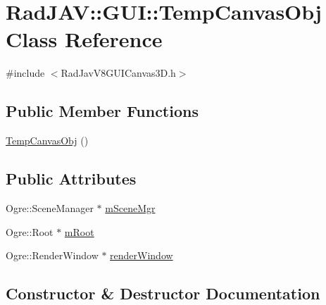 \hypertarget{class_rad_j_a_v_1_1_g_u_i_1_1_temp_canvas_obj}{}\section{Rad\+J\+AV\+:\+:G\+UI\+:\+:Temp\+Canvas\+Obj Class Reference}
\label{class_rad_j_a_v_1_1_g_u_i_1_1_temp_canvas_obj}


{\ttfamily \#include $<$Rad\+Jav\+V8\+G\+U\+I\+Canvas3\+D.\+h$>$}

\subsection*{Public Member Functions}
\begin{DoxyCompactItemize}
\item 
\mbox{\hyperlink{class_rad_j_a_v_1_1_g_u_i_1_1_temp_canvas_obj_ae1a5fb66696f2b94de71652f0613ca5a}{Temp\+Canvas\+Obj}} ()
\end{DoxyCompactItemize}
\subsection*{Public Attributes}
\begin{DoxyCompactItemize}
\item 
Ogre\+::\+Scene\+Manager $\ast$ \mbox{\hyperlink{class_rad_j_a_v_1_1_g_u_i_1_1_temp_canvas_obj_aa2b8387f14ff02b5db4621f9daed10a1}{m\+Scene\+Mgr}}
\item 
Ogre\+::\+Root $\ast$ \mbox{\hyperlink{class_rad_j_a_v_1_1_g_u_i_1_1_temp_canvas_obj_a0031148715e2ea9e16e94119e50fe462}{m\+Root}}
\item 
Ogre\+::\+Render\+Window $\ast$ \mbox{\hyperlink{class_rad_j_a_v_1_1_g_u_i_1_1_temp_canvas_obj_a213b57816b6cc626aa4d6572143201db}{render\+Window}}
\end{DoxyCompactItemize}


\subsection{Constructor \& Destructor Documentation}
\mbox{\label{class_rad_j_a_v_1_1_g_u_i_1_1_temp_canvas_obj_ae1a5fb66696f2b94de71652f0613ca5a}} 
